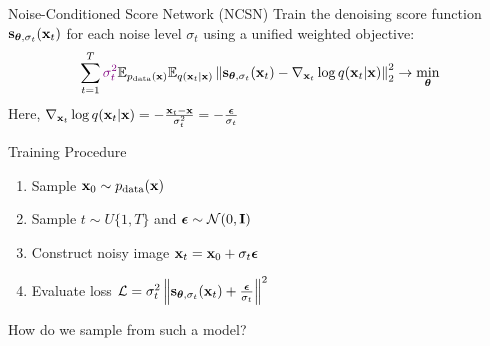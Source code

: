 \documentclass{beamer}
\begin{document}
\begin{frame}{Noise-Conditioned Score Network (NCSN)}
	Train the denoising score function $\mathbf{s}_{\boldsymbol{\theta}, \sigma_t}(\mathbf{x}_t)$ for each noise level $\sigma_t$ using a unified weighted objective:
	\vspace{-0.2cm}
	\[
		\sum_{t=1}^T {\color{violet}\sigma_t^2} \mathbb{E}_{p_{\text{data}}(\mathbf{x})} \mathbb{E}_{q(\mathbf{x}_t | \mathbf{x})}\left\| \mathbf{s}_{\boldsymbol{\theta}, \sigma_t}(\mathbf{x}_t) - \nabla_{\mathbf{x}_t} \log q(\mathbf{x}_t | \mathbf{x}) \right\|_2^2 \rightarrow \min_{\boldsymbol{\theta}}
	\]
    \eqpause
	Here, $\nabla_{\mathbf{x}_t} \log q(\mathbf{x}_t | \mathbf{x}) = - \frac{\mathbf{x}_t - \mathbf{x}}{\sigma_t^2} = - \frac{\boldsymbol{\epsilon}}{\sigma_t}$
    \eqpause
	\begin{block}{Training Procedure}
		\begin{enumerate}
			\item Sample $\mathbf{x}_0 \sim p_{\text{data}}(\mathbf{x})$
			\item Sample $t \sim U\{1, T\}$ and $\boldsymbol{\epsilon} \sim \mathcal{N}(0, \mathbf{I})$
			\item Construct noisy image $\mathbf{x}_t = \mathbf{x}_0 + \sigma_t \boldsymbol{\epsilon}$
			\item Evaluate loss $ \mathcal{L} = \sigma_t^2 \left\| \mathbf{s}_{\boldsymbol{\theta}, \sigma_t}(\mathbf{x}_t) + \frac{\boldsymbol{\epsilon}}{\sigma_t} \right\|^2 $
		\end{enumerate}
		\vspace{-0.3cm}
	\end{block}
    \eqpause
	How do we sample from such a model?
\end{frame}
\end{document}
